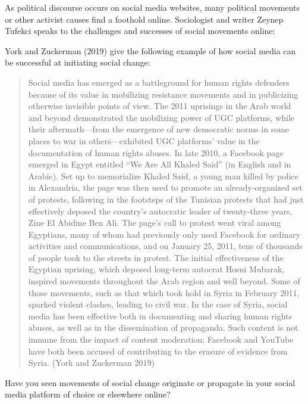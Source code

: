 \documentclass[
  letterpaper,
  DIV=11,
  numbers=noendperiod]{scrreprt}
\begin{document}
As political discourse occurs on social media websites, many political
movements or other activist causes find a foothold online. Sociologist
and writer Zeynep Tufekci speaks to the challenges and successes of
social movements online:

York and Zuckerman (2019) give the following example of how social media
can be successful at initiating social change:

\begin{quote}
Social media has emerged as a battleground for human rights defenders
because of its value in mobilizing resistance movements and in
publicizing otherwise invisible points of view. The 2011 uprisings in
the Arab world and beyond demonstrated the mobilizing power of UGC
platforms, while their aftermath---from the emergence of new democratic
norms in some places to war in others---exhibited UGC platforms' value
in the documentation of human rights abuses. In late 2010, a Facebook
page emerged in Egypt entitled ``We Are All Khaled Said'' (in English
and in Arabic). Set up to memorialize Khaled Said, a young man killed by
police in Alexandria, the page was then used to promote an
already-organized set of protests, following in the footsteps of the
Tunisian protests that had just effectively deposed the country's
autocratic leader of twenty-three years, Zine El Abidine Ben Ali. The
page's call to protest went viral among Egyptians, many of whom had
previously only used Facebook for ordinary activities and
communications, and on January 25, 2011, tens of thousands of people
took to the streets in protest. The initial effectiveness of the
Egyptian uprising, which deposed long-term autocrat Hosni Mubarak,
inspired movements throughout the Arab region and well beyond. Some of
those movements, such as that which took hold in Syria in February 2011,
sparked violent clashes, leading to civil war. In the case of Syria,
social media has been effective both in documenting and sharing human
rights abuses, as well as in the dissemination of propaganda. Such
content is not immune from the impact of content moderation; Facebook
and YouTube have both been accused of contributing to the erasure of
evidence from Syria. (York and Zuckerman 2019)
\end{quote}

\begin{tcolorbox}[enhanced jigsaw, arc=.35mm, bottomrule=.15mm, bottomtitle=1mm, breakable, colback=white, colbacktitle=quarto-callout-tip-color!10!white, colframe=quarto-callout-tip-color-frame, coltitle=black, left=2mm, leftrule=.75mm, opacityback=0, opacitybacktitle=0.6, rightrule=.15mm, title=\textcolor{quarto-callout-tip-color}{\faLightbulb}\hspace{0.5em}{Stop and reflect}, titlerule=0mm, toprule=.15mm, toptitle=1mm]

Have you seen movements of social change originate or propagate in your
social media platform of choice or elsewhere online?

\end{tcolorbox}
\end{document}
